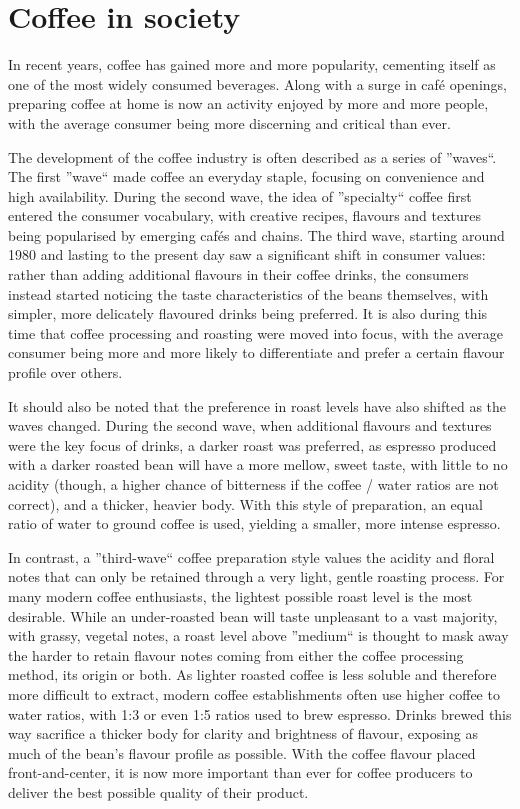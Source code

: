 \section{Coffee in society}
\label{sec:coffee-in-society} In recent years, coffee has gained more and more popularity,
cementing itself as one of the most widely consumed beverages. Along with a surge
in café openings, preparing coffee at home is now an activity enjoyed by more
and more people, with the average consumer being more discerning and critical than
ever.

The development of the coffee industry is often described as a series of ''waves``.
The first ''wave`` made coffee an everyday staple, focusing on convenience and high
availability. During the second wave, the idea of ''specialty`` coffee first entered
the consumer vocabulary, with creative recipes, flavours and textures being popularised
by emerging cafés and chains. The third wave, starting around 1980 and lasting to
the present day saw a significant shift in consumer values: rather than adding
additional flavours in their coffee drinks, the consumers instead started noticing
the taste characteristics of the beans themselves, with simpler, more delicately
flavoured drinks being preferred. It is also during this time that coffee
processing and roasting were moved into focus, with the average consumer being more
and more likely to differentiate and prefer a certain flavour profile over others.

It should also be noted that the preference in roast levels have also shifted as
the waves changed. During the second wave, when additional flavours and textures
were the key focus of drinks, a darker roast was preferred, as espresso produced
with a darker roasted bean will have a more mellow, sweet taste, with little to no
acidity (though, a higher chance of bitterness if the coffee / water ratios are not
correct), and a thicker, heavier body. With this style of preparation, an equal
ratio of water to ground coffee is used, yielding a smaller, more intense
espresso.

In contrast, a ''third-wave`` coffee preparation style values the acidity and floral
notes that can only be retained through a very light, gentle roasting process. For
many modern coffee enthusiasts, the lightest possible roast level is the most
desirable. While an under-roasted bean will taste unpleasant to a vast majority,
with grassy, vegetal notes, a roast level above ''medium`` is thought to mask
away the harder to retain flavour notes coming from either the coffee processing
method, its origin or both. As lighter roasted coffee is less soluble and
therefore more difficult to extract, modern coffee establishments often use higher
coffee to water ratios, with 1:3 or even 1:5 ratios used to brew espresso. Drinks
brewed this way sacrifice a thicker body for clarity and brightness of flavour,
exposing as much of the bean's flavour profile as possible. With the coffee flavour
placed front-and-center, it is now more important than ever for coffee producers
to deliver the best possible quality of their product.

